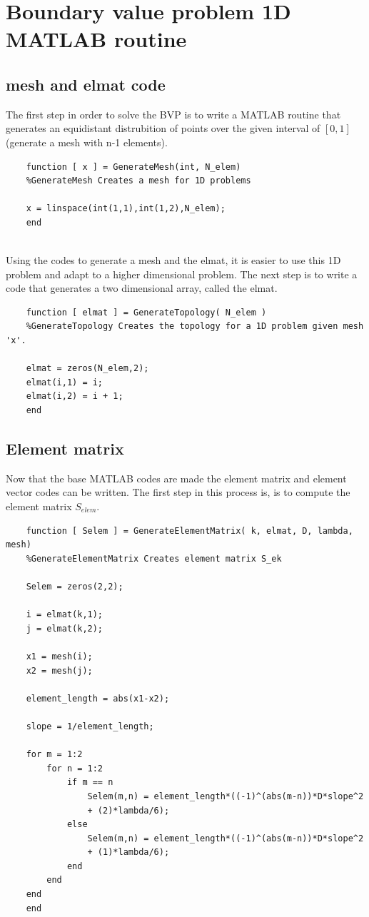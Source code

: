 \documentclass[a4paper]{report}
\begin{document}
\section{Boundary value problem 1D MATLAB routine}

\subsection{mesh and elmat code}
The first step in order to solve the BVP is to write a MATLAB routine that generates an equidistant distrubition of points over the given interval of $[0,1]$(generate a mesh with n-1 elements).

\begin{lstlisting}
	function [ x ] = GenerateMesh(int, N_elem)
	%GenerateMesh Creates a mesh for 1D problems
	
	x = linspace(int(1,1),int(1,2),N_elem);
	end
	
\end{lstlisting}
	
Using the codes to generate a mesh and the elmat, it is easier to use this 1D problem and adapt to a higher dimensional problem. The next step is to write a code that generates a two dimensional array, called the elmat.
\newpage
\begin{lstlisting}
	function [ elmat ] = GenerateTopology( N_elem )
	%GenerateTopology Creates the topology for a 1D problem given mesh 'x'.
	
	elmat = zeros(N_elem,2);
	elmat(i,1) = i;
	elmat(i,2) = i + 1;
	end

\end{lstlisting}

\subsection{Element matrix}

Now that the base MATLAB codes are made the element matrix and element vector codes can be written. The first step in this process is, is to compute the element matrix $S_{elem}$.

\begin{lstlisting}
	function [ Selem ] = GenerateElementMatrix( k, elmat, D, lambda, mesh)
	%GenerateElementMatrix Creates element matrix S_ek
		
	Selem = zeros(2,2);
	
	i = elmat(k,1);
	j = elmat(k,2);
	
	x1 = mesh(i);
	x2 = mesh(j);
	
	element_length = abs(x1-x2);
	
	slope = 1/element_length; 
	
	for m = 1:2
		for n = 1:2
			if m == n
				Selem(m,n) = element_length*((-1)^(abs(m-n))*D*slope^2
				+ (2)*lambda/6);
			else
				Selem(m,n) = element_length*((-1)^(abs(m-n))*D*slope^2
				+ (1)*lambda/6);
			end
		end
	end
	end
\end{lstlisting}
\end{document}
